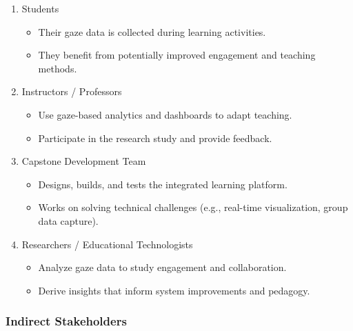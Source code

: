 \documentclass{article}
\begin{document}
\begin{enumerate}
    \item Students
    \begin{itemize}
        \item Their gaze data is collected during learning activities.
        \item They benefit from potentially improved engagement and teaching methods.
    \end{itemize}

    \item Instructors / Professors
    \begin{itemize}
        \item Use gaze-based analytics and dashboards to adapt teaching.
        \item Participate in the research study and provide feedback.
    \end{itemize}

    \item Capstone Development Team
    \begin{itemize}
        \item Designs, builds, and tests the integrated learning platform.
        \item Works on solving technical challenges (e.g., real-time visualization, group data capture).
    \end{itemize}

    \item Researchers / Educational Technologists
    \begin{itemize}
        \item Analyze gaze data to study engagement and collaboration.
        \item Derive insights that inform system improvements and pedagogy.
    \end{itemize}
\end{enumerate}

\subsubsection*{Indirect Stakeholders}
\end{document}
